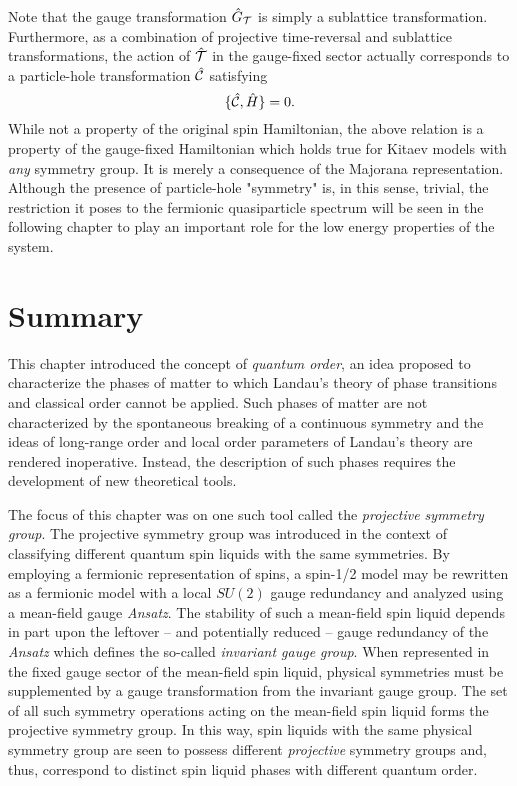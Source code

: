 Note that the gauge transformation $\hat{G}_{\mathcal{T}}$ is simply a sublattice transformation.
Furthermore, as a combination of projective time-reversal and sublattice transformations, the action of $\hat{\mathcal{T}}$ in the gauge-fixed sector actually corresponds to a particle-hole transformation $\hat{\mathcal{C}}$ satisfying
%
\begin{equation}
	\{\hat{\mathcal{C}}, \hat{H}\} = 0.
	\label{eq:chapter04_ParticleHole}
\end{equation}
%
While not a property of the original spin Hamiltonian, the above relation is a property of the gauge-fixed Hamiltonian which holds true for Kitaev models with \textit{any} symmetry group.
It is merely a consequence of the Majorana representation.
Although the presence of particle-hole "symmetry" is, in this sense, trivial, the restriction it poses to the fermionic quasiparticle spectrum will be seen in the following chapter to play an important role for the low energy properties of the system.


%
%
\section{Summary}
\label{section:chapter04_Summary}
%
%
This chapter introduced the concept of \textit{quantum order}, an idea proposed to characterize the phases of matter to which Landau's theory of phase transitions and classical order cannot be applied.
Such phases of matter are not characterized by the spontaneous breaking of a continuous symmetry and the ideas of long-range order and local order parameters of Landau's theory are rendered inoperative.
Instead, the description of such phases requires the development of new theoretical tools.

The focus of this chapter was on one such tool called the \textit{projective symmetry group}.
The projective symmetry group was introduced in the context of classifying different quantum spin liquids with the same symmetries.
By employing a fermionic representation of spins, a spin-1/2 model may be rewritten as a fermionic model with a local $SU(2)$ gauge redundancy and analyzed using a mean-field gauge \textit{Ansatz}.
The stability of such a mean-field spin liquid depends in part upon the leftover -- and potentially reduced -- gauge redundancy of the \textit{Ansatz} which defines the so-called \textit{invariant gauge group}.
When represented in the fixed gauge sector of the mean-field spin liquid, physical symmetries must be supplemented by a gauge transformation from the invariant gauge group.
The set of all such symmetry operations acting on the mean-field spin liquid forms the projective symmetry group.
In this way, spin liquids with the same physical symmetry group are seen to possess different \textit{projective} symmetry groups and, thus, correspond to distinct spin liquid phases with different quantum order.


